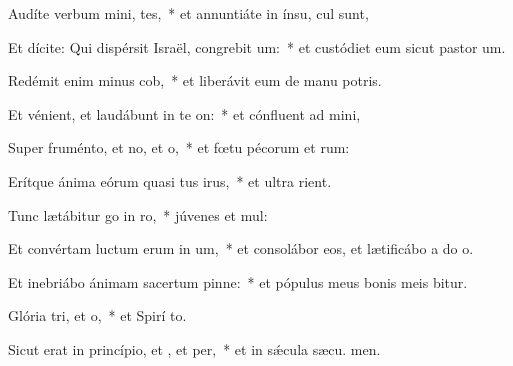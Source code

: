 \item Audíte verbum mini, tes,~* et annuntiáte in ínsu,  cul sunt,
\item Et dícite: Qui dispérsit Israël, congrebit um:~* et custódiet eum sicut pastor  um.
\item Redémit enim minus cob,~* et liberávit eum de manu potris.
\item Et vénient, et laudábunt in te on:~* et cónfluent ad  mini,
\item Super fruménto, et no, et o,~* et fœtu pécorum et rum:
\item Erítque ánima eórum quasi tus irus,~* et ultra  rient.
\item Tunc lætábitur go in ro,~* júvenes et  mul:
\item Et convértam luctum erum in um,~* et consolábor eos, et lætificábo a do o.
\item Et inebriábo ánimam sacertum pinne:~* et pópulus meus bonis meis bitur.
\item Glória tri, et o,~* et Spirí to.
\item Sicut erat in princípio, et , et per,~* et in sǽcula sæcu. men.

